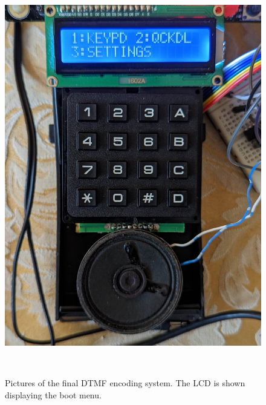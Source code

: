 \documentclass[11pt,a4paper,twocolumn]{scrartcl}
\begin{document}
\begin{figure}
\begin{minipage}[b]{0.4\textwidth}
     \includegraphics[width=\textwidth]{microcontroller_project.jpg}
   \end{minipage}
   \caption{Pictures of the final DTMF encoding system. The LCD is shown displaying the boot menu.}~\label{fig:system-pics}
\end{figure}



\end{document}
